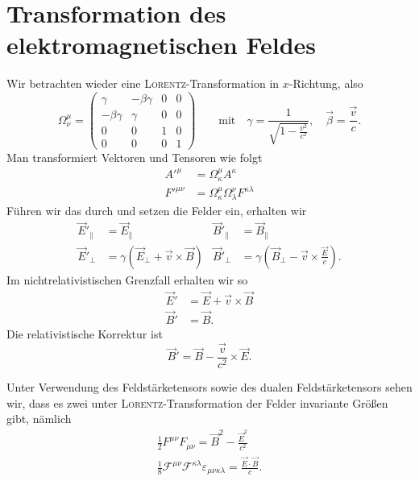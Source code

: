 \section{Transformation des elektromagnetischen Feldes}

Wir betrachten wieder eine \textsc{Lorentz}-Transformation in $x$-Richtung, also
\begin{equation*}
\Omega_\nu^\mu = \begin{pmatrix}
\gamma &-\beta\gamma & 0 & 0 \\
-\beta\gamma & \gamma & 0 & 0 \\
0 & 0 & 1 & 0\\
0 & 0 & 0 & 1
\end{pmatrix}  \qquad \text{mit}\quad \gamma=\frac{1}{\sqrt{1-\frac{v^2}{c^2}}}, \quad \vec{\beta} = \frac{\vec{v}}{c}.
\end{equation*}
Man transformiert Vektoren und Tensoren wie folgt
\begin{align*}
A'^\mu &= \Omega_\kappa^\mu A^\kappa\\
F'^{\mu\nu} &= \Omega_\kappa^\mu\Omega_\lambda^\nu F^{\kappa\lambda}
\end{align*}
Führen wir das durch und setzen die Felder ein, erhalten wir
\begin{align*}
\vec{E}'_\parallel &= \vec{E}_\parallel & \vec{B}'_\parallel &=\vec{B}_\parallel\\
\vec{E}'_\perp &= \gamma\left(\vec{E}_\perp + \vec{v}\times\vec{B}\right)
& \vec{B}'_\perp &= \gamma\left(\vec{B}_\perp - \vec{v}\times\frac{\vec{E}}{c}\right).
\end{align*}
Im nichtrelativistischen Grenzfall erhalten wir so
\begin{align*}
\vec{E}' &= \vec{E} + \vec{v}\times\vec{B}\\
\vec{B}' &= \vec{B}.
\end{align*}
Die relativistische Korrektur ist
\begin{equation*}
\vec{B}' = \vec{B} - \frac{\vec{v}}{c^2}\times\vec{E}.
\end{equation*}

Unter Verwendung des Feldstärketensors sowie des dualen Feldstärketensors sehen wir, dass es zwei unter \textsc{Lorentz}-Transformation der Felder invariante Größen gibt, nämlich
\begin{align*}
\frac{1}{2}F^{\mu\nu}F_{\mu\nu}= \vec{B}^2 -\frac{\vec{E}^2}{c^2} \\
\frac{1}{8}\mathcal{F}^{\mu\nu}\mathcal{F}^{\kappa\lambda}\varepsilon_{\mu\nu\kappa\lambda} = \frac{\vec{E}\cdot\vec{B}}{c}.
\end{align*}


